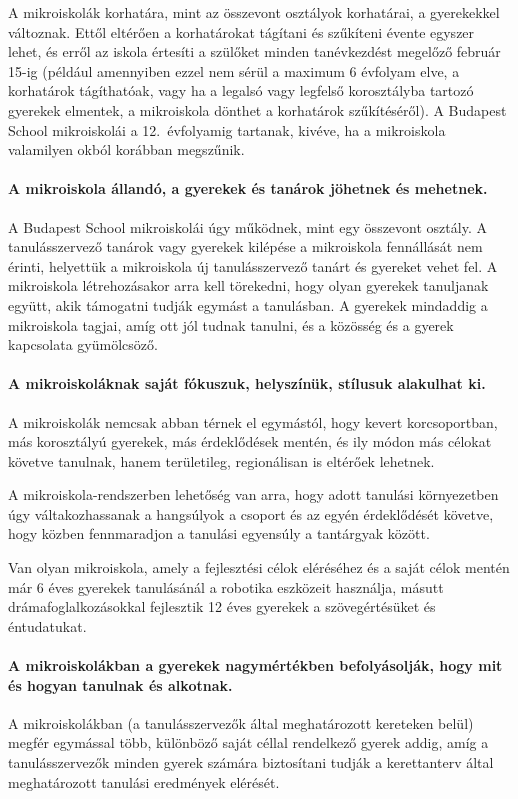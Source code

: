 A mikroiskolák korhatára, mint az összevont osztályok korhatárai, a gyerekekkel változnak. Ettől eltérően a korhatárokat tágítani és szűkíteni évente egyszer lehet, és erről az iskola értesíti a szülőket minden tanévkezdést megelőző február 15-ig (például amennyiben ezzel nem sérül a maximum 6 évfolyam elve, a korhatárok tágíthatóak, vagy ha a legalsó vagy legfelső korosztályba tartozó gyerekek elmentek, a mikroiskola dönthet a korhatárok szűkítéséről). A Budapest School mikroiskolái a 12.~évfolyamig tartanak, kivéve, ha a mikroiskola valamilyen okból korábban megszűnik.

\paragraph{A mikroiskola állandó, a gyerekek és tanárok jöhetnek és
  mehetnek.}
A Budapest School mikroiskolái úgy működnek, mint egy összevont
osztály. A tanulásszervező tanárok vagy gyerekek kilépése a
mikroiskola
fennállását nem érinti, helyettük a mikroiskola új tanulásszervező tanárt és gyereket vehet fel.  A mikroiskola létrehozásakor arra kell törekedni, hogy olyan gyerekek tanuljanak együtt, akik támogatni tudják egymást a tanulásban. A gyerekek mindaddig a mikroiskola tagjai, amíg ott jól tudnak tanulni, és a közösség és a gyerek kapcsolata gyümölcsöző.

\paragraph{A mikroiskoláknak saját fókuszuk, helyszínük, stílusuk
  alakulhat ki.}
A mikroiskolák nemcsak abban térnek el egymástól, hogy kevert korcsoportban, más korosztályú gyerekek, más érdeklődések mentén, és ily módon más célokat követve tanulnak, hanem területileg, regionálisan is eltérőek lehetnek.

A mikroiskola-rendszerben lehetőség van arra, hogy adott tanulási környezetben úgy váltakozhassanak a hangsúlyok a csoport és az egyén érdeklődését követve, hogy közben fennmaradjon a tanulási egyensúly a tantárgyak között.

Van olyan mikroiskola, amely a fejlesztési célok eléréséhez és a saját célok mentén már 6 éves gyerekek tanulásánál a robotika eszközeit használja, másutt drámafoglalkozásokkal fejlesztik 12 éves gyerekek a szövegértésüket és éntudatukat.

\paragraph{A mikroiskolákban a gyerekek nagymértékben befolyásolják, hogy mit és hogyan tanulnak és alkotnak.}
A mikroiskolákban (a tanulásszervezők által meghatározott kereteken
belül) megfér egymással több, különböző saját céllal rendelkező gyerek
addig, amíg a tanulásszervezők minden gyerek számára biztosítani
tudják a kerettanterv által meghatározott tanulási\linebreak
eredmények elérését.

